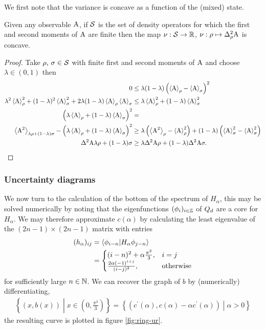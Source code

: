 We first note that the variance is concave as a function of the (mixed) state.
\begin{lem}
  Given any observable $\operatorname{A}$, if $\dops$ is the set of density operators for which the first and second moments of $\operatorname{A}$ are finite then the map $\nu:\dops\to \R$, $\nu:\rho\mapsto \varr{\opa}$ is concave.
\end{lem}
\begin{proof}
  Take $\rho,\, \sigma \in \dops$ with finite first and second moments of $\operatorname{A}$ and choose $\lambda \in (0,1)$ then
  \begin{align}
    0&\leq \lambda(1-\lambda) \left(\expe{\opa}{\rho} - \expe{\opa}{\sigma}\right)^2\\
    \lambda^2 \expe{\opa}{\rho}^2 + (1- \lambda)^2\expe{\opa}{\sigma}^2 + 2\lambda(1-\lambda)\expe{\opa}{\rho}\expe{\opa}{\sigma} &\leq \lambda \expe{\opa}{\rho}^2 + (1-\lambda) \expe{\opa}{\sigma}^2\\
    \left(\lambda \expe{\opa}{\rho} + (1- \lambda)\expe{\opa}{\sigma}\right)^2 &=\\
    \expe{\opa^2}{\lambda\rho + (1-\lambda)\sigma} - \left(\lambda \expe{\opa}{\rho} + (1- \lambda)\expe{\opa}{\sigma}\right)^2 &\geq \lambda\left(\expe{\opa^2}{\rho} -\expe{\opa}{\rho}^2\right) + (1-\lambda)\left(\expe{\opa}{\sigma}^2 -\expe{\opa}{\sigma}^2\right)\\
    \var{\opa}{\lambda\rho + (1-\lambda)\sigma} &\geq \lambda \var{\opa}{\rho} + (1-\lambda ) \var{\opa}{\sigma}.
  \end{align}
\end{proof}
\subsubsection{Uncertainty diagrams}
We now turn to the calculation of the bottom of the spectrum of $H_\alpha$, this may be solved numerically by noting that the eigenfunctions $(\phi_i)_{i\in\mathbb{Z}}$ of $Q_d$ are a core for $H_\alpha$. We may therefore approximate $c(\alpha)$ by calculating the least eigenvalue of the $(2n-1)\times (2n-1)$ matrix with entries
\begin{align}
  (h_\alpha)_{ij} &= \langle \phi_{i-n}|H_\alpha \phi_{j-n}\rangle\\
                  &= \begin{cases}(i-n)^2 + \alpha\frac{\pi^2}{3},& i = j\\ \frac{2 \alpha(-1)^{i+j}}{(i-j)^2}, & \text{otherwise}\end{cases}
\end{align}
for sufficiently large $n\in\mathbb{N}$. We can recover the graph of $b$ by (numerically) differentiating, 
\begin{align}
  \left\{(x,b(x))\middle|x\in \left(0,\frac{\pi^2}{3}\right)\right\} = \left\{ (c^\prime(\alpha), c(\alpha)-\alpha c^\prime(\alpha))\middle| \alpha > 0\right\}
\end{align}
the resulting curve is plotted in figure \ref{fig:ring-ur}.

